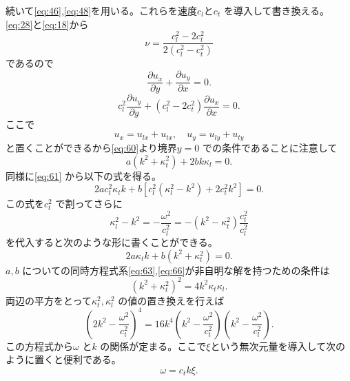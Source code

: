 \documentclass[dvipdfmx,11pt]{jsreport}
\numberwithin{equation}{chapter}
\numberwithin{table}{chapter}
\begin{document}
続いて\eqref{eq:46},\eqref{eq:48}を用いる。これらを速度$c_l$と$c_t$ を導入して書き換える。
\eqref{eq:28}と\eqref{eq:18}から
\begin{equation}
\label{eq:59}
	\nu=\frac{c_l^2-2c_t^2}{2(c_l^2-c_t^2)}
\end{equation}
であるので
\begin{equation}
\label{eq:60}
	\frac{\partial u_x}{\partial y} +\frac{\partial u_y}{\partial x} =0
.\end{equation}
\begin{equation}
\label{eq:61}
	c_{l}^2\frac{\partial u_y}{\partial y} +(c_l^2-2c_t^2)\frac{\partial u_x}{\partial x} =0
.\end{equation}
ここで
\begin{equation}
\label{eq:62}
	u_x=u_{lx}+u_{tx},\quad u_{y}=u_{ly}+u_{ty}
\end{equation}
と置くことができるから\eqref{eq:60}より境界$y=0$ での条件であることに注意して
\begin{equation}
\label{eq:63}
	a(k^2+\kappa^2_t)+2bk\kappa_l=0
.\end{equation}
同様に\eqref{eq:61}
から以下の式を得る。
\begin{equation}
\label{eq:64}
	2ac_t^2\kappa_tk+b\left[ c_l^2(\kappa_l^2-k^2)+2c_t^2k^2 \right] =0
.\end{equation}
この式を$c_t^2$ で割ってさらに
\begin{equation}
\label{eq:65}
	\kappa_l^2-k^2=-\frac{\omega^2}{c_l^2}=-(k^2-\kappa_t^2) \frac{c_t^2}{c_l^2}
\end{equation}
を代入すると次のような形に書くことができる。
\begin{equation}
\label{eq:66}
	2a\kappa_tk+b(k^2+\kappa_t^2)=0
.\end{equation}
$a,b$ についての同時方程式系\eqref{eq:63},\eqref{eq:66}が非自明な解を持つための条件は
\begin{equation}
\label{eq:67}
	(k^2+\kappa_t^2)^2=4k^2\kappa_t\kappa_l
.\end{equation}
両辺の平方をとって$\kappa_t^2,\kappa_l^2$ の値の置き換えを行えば
\begin{equation}
\label{eq:68}
\left( 2k^2-\frac{\omega^2}{c_t^2} \right) ^{4}=16k^{4}\left( k^2-\frac{\omega^2}{c_t^2} \right) \left( k^2-\frac{\omega^2}{c_l^2} \right) 
.\end{equation}
この方程式から$\omega$ と$k$ の関係が定まる。ここで$\xi$という無次元量を導入して次のように置くと便利である。
\begin{equation}
\label{eq:69}
	\omega=c_t k\xi
.\end{equation}
\end{document}
